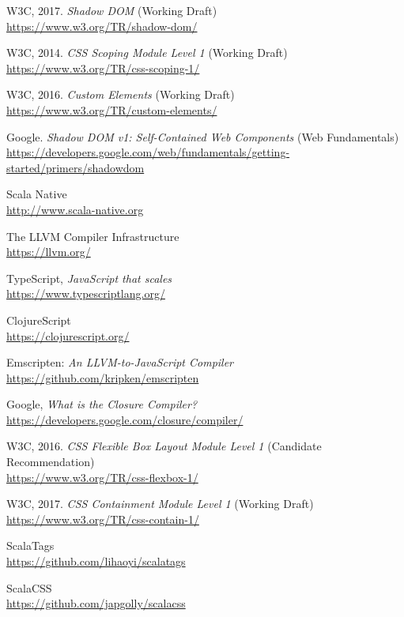 \begin{thebibliography}{99}
W3C, 2017. \emph{Shadow DOM} (Working Draft)\\
\url{https://www.w3.org/TR/shadow-dom/}

W3C, 2014. \emph{CSS Scoping Module Level 1} (Working Draft)\\
\url{https://www.w3.org/TR/css-scoping-1/}

W3C, 2016. \emph{Custom Elements} (Working Draft)\\
\url{https://www.w3.org/TR/custom-elements/}

Google. \emph{Shadow DOM v1: Self-Contained Web Components} (Web Fundamentals)\\
\url{https://developers.google.com/web/fundamentals/getting-started/primers/shadowdom}

Scala Native\\
\url{http://www.scala-native.org}

The LLVM Compiler Infrastructure\\
\url{https://llvm.org/}

TypeScript, \emph{JavaScript that scales}\\
\url{https://www.typescriptlang.org/}

ClojureScript\\
\url{https://clojurescript.org/}

Emscripten: \emph{An LLVM-to-JavaScript Compiler}\\
\url{https://github.com/kripken/emscripten}

Google, \emph{What is the Closure Compiler?}\\
\url{https://developers.google.com/closure/compiler/}

W3C, 2016. \emph{CSS Flexible Box Layout Module Level 1} (Candidate Recommendation)\\
\url{https://www.w3.org/TR/css-flexbox-1/}

W3C, 2017. \emph{CSS Containment Module Level 1} (Working Draft)\\
\url{https://www.w3.org/TR/css-contain-1/}

ScalaTags\\
\url{https://github.com/lihaoyi/scalatags}

ScalaCSS\\
\url{https://github.com/japgolly/scalacss}


\end{thebibliography}
